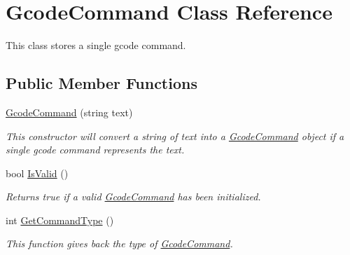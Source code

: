\hypertarget{class_gcode_command}{}\section{Gcode\+Command Class Reference}
\label{class_gcode_command}


This class stores a single gcode command.  


\subsection*{Public Member Functions}
\begin{DoxyCompactItemize}
\item 
\hyperlink{class_gcode_command_aefd8e6144be3153471b2ee5e5fc500de}{Gcode\+Command} (string text)
\begin{DoxyCompactList}\small\item\em This constructor will convert a string of text into a \hyperlink{class_gcode_command}{Gcode\+Command} object if a single gcode command represents the text. \end{DoxyCompactList}\item 
bool \hyperlink{class_gcode_command_a21ddb89f360e9a2497855064cda0672a}{Is\+Valid} ()
\begin{DoxyCompactList}\small\item\em Returns true if a valid \hyperlink{class_gcode_command}{Gcode\+Command} has been initialized. \end{DoxyCompactList}\item 
int \hyperlink{class_gcode_command_ad40c68e4595b030959155c66fb66f154}{Get\+Command\+Type} ()
\begin{DoxyCompactList}\small\item\em This function gives back the type of \hyperlink{class_gcode_command}{Gcode\+Command}. \end{DoxyCompactList}\end{DoxyCompactItemize}
